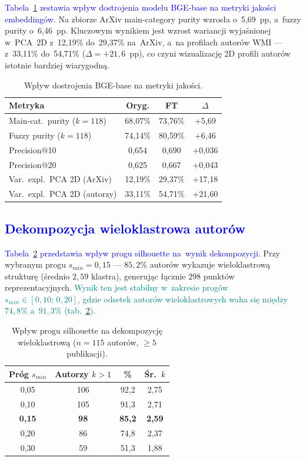 \documentclass[a4paper,11pt,twocolumn]{article}
\newcommand{\hl}[1]{\textcolor{blue}{#1}}
\newcommand{\hlme}[1]{\textcolor{teal}{#1}}
\begin{document}
\hl{Tabela~\ref{tab:finetune} zestawia wpływ dostrojenia modelu
BGE-base na metryki jakości embeddingów.} Na zbiorze
ArXiv main-category purity wzrosła o~5,69~pp, a~fuzzy purity
o~6,46~pp. Kluczowym wynikiem jest wzrost wariancji wyjaśnionej
w~PCA~2D z~12,19\% do~29,37\% na~ArXiv, a~na profilach autorów
WMI --- z~33,11\% do~54,71\% ($\Delta=+21{,}6$~pp),
co czyni wizualizację 2D profili autorów istotnie bardziej wiarygodną.

\begin{table}[t]
\centering
\caption{Wpływ dostrojenia BGE-base na metryki jakości.}
\label{tab:finetune}
\small
\begin{tabular}{@{}lccc@{}}
\toprule
Metryka & Oryg. & FT & $\Delta$ \\
\midrule
Main-cat.\ purity ($k\!=\!118$) & 68,07\% & 73,76\% & +5,69 \\
Fuzzy purity ($k\!=\!118$) & 74,14\% & 80,59\% & +6,46 \\
Precision@10 & 0,654 & 0,690 & +0,036 \\
Precision@20 & 0,625 & 0,667 & +0,043 \\
Var.\ expl.\ PCA 2D (ArXiv) & 12,19\% & 29,37\% & +17,18 \\
Var.\ expl.\ PCA 2D (autorzy) & 33,11\% & 54,71\% & +21,60 \\
\bottomrule
\end{tabular}
\end{table}


\subsection{\hl{Dekompozycja wieloklastrowa autorów}}

\hl{Tabela~\ref{tab:threshold} przedstawia wpływ progu silhouette
na~wynik dekompozycji.} Przy wybranym progu $s_{min}=0{,}15$ ---
$85{,}2\%$ autorów wykazuje wieloklastrową strukturę (średnio $2{,}59$
klastra), generując łącznie $298$ punktów reprezentacyjnych.
\hlme{Wynik ten jest stabilny w~zakresie progów $s_{min} \in [0{,}10;\,0{,}20]$,
gdzie odsetek autorów wieloklastrowych waha się między $74{,}8\%$
a~$91{,}3\%$ (tab.~\ref{tab:threshold}).}

\begin{table}[t]
\centering
\caption{Wpływ progu silhouette na dekompozycję wieloklastrową
($n=115$ autorów, $\geq 5$ publikacji).}
\label{tab:threshold}
\small
\begin{tabular}{@{}cccc@{}}
\toprule
Próg $s_{min}$ & Autorzy $k\!>\!1$ & \% & Śr.\ $k$ \\
\midrule
0,05 & 106 & 92,2 & 2,75 \\
0,10 & 105 & 91,3 & 2,71 \\
\textbf{0,15} & \textbf{98} & \textbf{85,2} & \textbf{2,59} \\
0,20 & 86  & 74,8 & 2,37 \\
0,30 & 59  & 51,3 & 1,88 \\
\bottomrule
\end{tabular}
\end{table}
\end{document}
